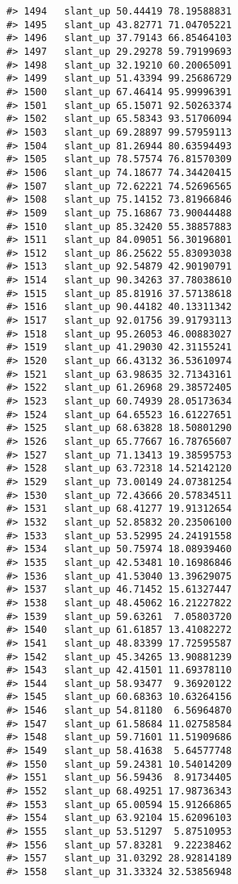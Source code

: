 \documentclass[
]{book}
\theoremstyle{definition}
\theoremstyle{definition}
\theoremstyle{definition}
\theoremstyle{definition}
\theoremstyle{remark}
\begin{document}
\begin{verbatim}
#> 1494   slant_up 50.44419 78.19588831
#> 1495   slant_up 43.82771 71.04705221
#> 1496   slant_up 37.79143 66.85464103
#> 1497   slant_up 29.29278 59.79199693
#> 1498   slant_up 32.19210 60.20065091
#> 1499   slant_up 51.43394 99.25686729
#> 1500   slant_up 67.46414 95.99996391
#> 1501   slant_up 65.15071 92.50263374
#> 1502   slant_up 65.58343 93.51706094
#> 1503   slant_up 69.28897 99.57959113
#> 1504   slant_up 81.26944 80.63594493
#> 1505   slant_up 78.57574 76.81570309
#> 1506   slant_up 74.18677 74.34420415
#> 1507   slant_up 72.62221 74.52696565
#> 1508   slant_up 75.14152 73.81966846
#> 1509   slant_up 75.16867 73.90044488
#> 1510   slant_up 85.32420 55.38857883
#> 1511   slant_up 84.09051 56.30196801
#> 1512   slant_up 86.25622 55.83093038
#> 1513   slant_up 92.54879 42.90190791
#> 1514   slant_up 90.34263 37.78038610
#> 1515   slant_up 85.81916 37.57138618
#> 1516   slant_up 90.44182 40.13311342
#> 1517   slant_up 92.01756 39.91793113
#> 1518   slant_up 95.26053 46.00883027
#> 1519   slant_up 41.29030 42.31155241
#> 1520   slant_up 66.43132 36.53610974
#> 1521   slant_up 63.98635 32.71343161
#> 1522   slant_up 61.26968 29.38572405
#> 1523   slant_up 60.74939 28.05173634
#> 1524   slant_up 64.65523 16.61227651
#> 1525   slant_up 68.63828 18.50801290
#> 1526   slant_up 65.77667 16.78765607
#> 1527   slant_up 71.13413 19.38595753
#> 1528   slant_up 63.72318 14.52142120
#> 1529   slant_up 73.00149 24.07381254
#> 1530   slant_up 72.43666 20.57834511
#> 1531   slant_up 68.41277 19.91312654
#> 1532   slant_up 52.85832 20.23506100
#> 1533   slant_up 53.52995 24.24191558
#> 1534   slant_up 50.75974 18.08939460
#> 1535   slant_up 42.53481 10.16986846
#> 1536   slant_up 41.53040 13.39629075
#> 1537   slant_up 46.71452 15.61327447
#> 1538   slant_up 48.45062 16.21227822
#> 1539   slant_up 59.63261  7.05803720
#> 1540   slant_up 61.61857 13.41082272
#> 1541   slant_up 48.83399 17.72595587
#> 1542   slant_up 45.34265 13.90881239
#> 1543   slant_up 42.41501 11.69378110
#> 1544   slant_up 58.93477  9.36920122
#> 1545   slant_up 60.68363 10.63264156
#> 1546   slant_up 54.81180  6.56964870
#> 1547   slant_up 61.58684 11.02758584
#> 1548   slant_up 59.71601 11.51909686
#> 1549   slant_up 58.41638  5.64577748
#> 1550   slant_up 59.24381 10.54014209
#> 1551   slant_up 56.59436  8.91734405
#> 1552   slant_up 68.49251 17.98736343
#> 1553   slant_up 65.00594 15.91266865
#> 1554   slant_up 63.92104 15.62096103
#> 1555   slant_up 53.51297  5.87510953
#> 1556   slant_up 57.83281  9.22238462
#> 1557   slant_up 31.03292 28.92814189
#> 1558   slant_up 31.33324 32.53856948

\end{verbatim}
\end{document}
